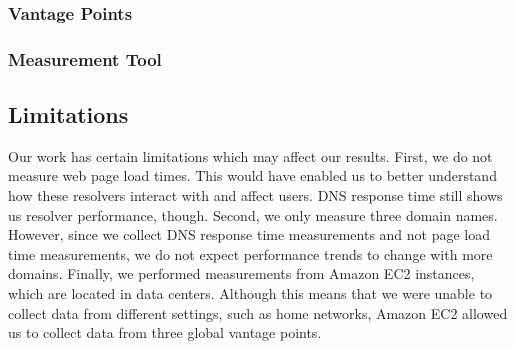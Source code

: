 \subsubsection{Vantage Points}

\subsubsection{Measurement Tool}

\subsection{Limitations}
Our work has certain limitations which may affect our results. 
First, we do not measure web page load times. 
This would have enabled us to better understand how these resolvers interact with and affect users. 
DNS response time still shows us resolver performance, though. 
Second, we only measure three domain names. 
However, since we collect DNS response time measurements and not page load time measurements, we do not expect performance trends to change with more domains.
Finally, we performed measurements from Amazon EC2 instances, which are located in data centers. 
Although this means that we were unable to collect data from different settings, such as home networks, Amazon EC2 allowed us to collect data from three global vantage points. 
